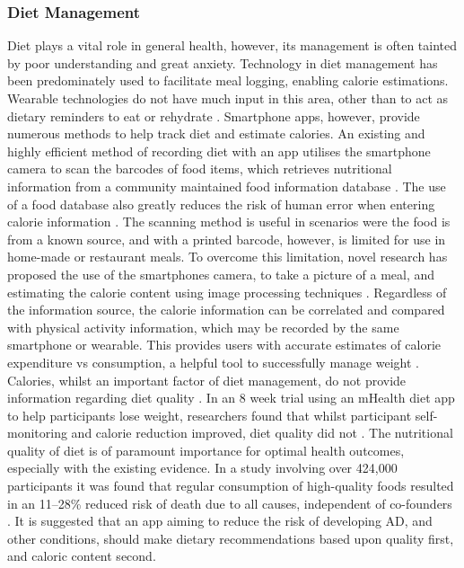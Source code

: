 \subsubsection{Diet Management}
Diet plays a vital role in general health, however, its management is often tainted by poor understanding and great anxiety. Technology in diet management has been predominately used to facilitate meal logging, enabling calorie estimations. Wearable technologies do not have much input in this area, other than to act as dietary reminders to eat or rehydrate \cite{Fortmann2014}. Smartphone apps, however, provide numerous methods to help track diet and estimate calories. An existing and highly efficient method of recording diet with an app utilises the smartphone camera to scan the barcodes of food items, which retrieves nutritional information from a community maintained food information database \cite{Breton2011}. The use of a food database also greatly reduces the risk of human error when entering calorie information \cite{Turner-McGrievy2013}. The scanning method is useful in scenarios were the food is from a known source, and with a printed barcode, however, is limited for use in home-made or restaurant meals. To overcome this limitation, novel research has proposed the use of the smartphones camera, to take a picture of a meal, and estimating the calorie content using image processing techniques \cite{Villalobos2012, Pouladzadeh2014}. Regardless of the information source, the calorie information can be correlated and compared with physical activity information, which may be recorded by the same smartphone or wearable. This provides users with accurate estimates of calorie expenditure vs consumption, a helpful tool to successfully manage weight \cite{DeLany2014}.
Calories, whilst an important factor of diet management, do not provide information regarding diet quality \cite{Wirt2009}. In an 8 week trial using an mHealth diet app to help participants lose weight, researchers found that whilst participant self-monitoring and calorie reduction improved, diet quality did not \cite{Wharton2015}. The nutritional quality of diet is of paramount importance for optimal health outcomes, especially with the existing evidence. In a study involving over 424,000 participants it was found that regular consumption of high-quality foods resulted in an 11–28\% reduced risk of death due to all causes, independent of co-founders \cite{Liese2015}. It is suggested that an app aiming to reduce the risk of developing AD, and other conditions, should make dietary recommendations based upon quality first, and caloric content second.


